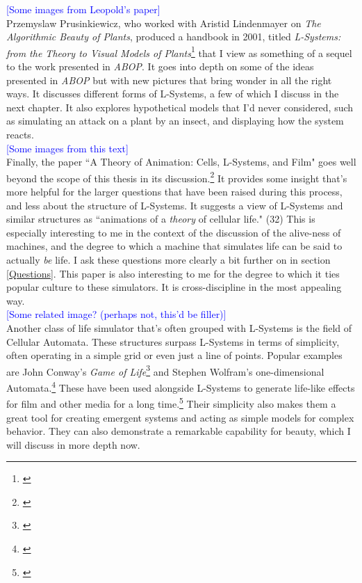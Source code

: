 \documentclass[12pt,twoside]{reedthesis}
\begin{document}
	\textcolor{blue}{[Some images from Leopold's paper]}\\
	
	Przemyslaw Prusinkiewicz, who worked with Aristid Lindenmayer on \textit{The Algorithmic Beauty of Plants}, produced a handbook in 2001, titled \textit{L-Systems: from the Theory to Visual Models of Plants}\footnote{\cite{LSystems2001}} that I view as something of a sequel to the work presented in \textit{ABOP}. It goes into depth on some of the ideas presented in \textit{ABOP} but with new pictures that bring wonder in all the right ways. It discusses different forms of L-Systems, a few of which I discuss in the next chapter. It also explores hypothetical models that I'd never considered, such as simulating an attack on a plant by an insect, and displaying how the system reacts.\\
	
	\textcolor{blue}{[Some images from this text]}\\
	
	Finally, the paper ``A Theory of Animation: Cells, L-Systems, and Film" goes well beyond the scope of this thesis in its discussion.\footnote{\cite{theory2004}} It provides some insight that's more helpful for the larger questions that have been raised during this process, and less about the structure of L-Systems. It suggests a view of L-Systems and similar structures as ``animations of a \textit{theory} of cellular life." (32) This is especially interesting to me in the context of the discussion of the alive-ness of machines, and the degree to which a machine that simulates life can be said to actually \textit{be} life. I ask these questions more clearly a bit further on in section \ref{Questions}. This paper is also interesting to me for the degree to which it ties popular culture to these simulators. It is cross-discipline in the most appealing way.\\
	
	\textcolor{blue}{[Some related image? (perhaps not, this'd be filler)]}\\
	
	Another class of life simulator that's often grouped with L-Systems is the field of Cellular Automata. These structures surpass L-Systems in terms of simplicity, often operating in a simple grid or even just a line of points. Popular examples are John Conway's \textit{Game of Life}\footnote{\cite{GameOfLife1970}} and Stephen Wolfram's one-dimensional Automata.\footnote{\cite{wolfram2002}} These have been used alongside L-Systems to generate life-like effects for film and other media for a long time.\footnote{\cite{theory2004}} Their simplicity also makes them a great tool for creating emergent systems and acting as simple models for complex behavior. They can also demonstrate a remarkable capability for beauty, which I will discuss in more depth now.
\end{document}
